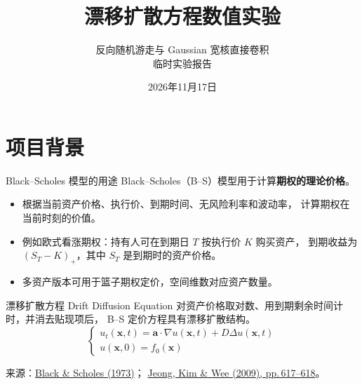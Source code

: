 \documentclass[UTF8,aspectratio=169,10pt]{ctexbeamer}
\title[漂移扩散方程的数值解]{漂移扩散方程数值实验}
\subtitle{反向随机游走与 Gaussian 宽核直接卷积\\临时实验报告}
\author{}\institute{}\date[]{2026年11月17日}
\begin{document}
\begin{frame}[plain]\titlepage\end{frame}
\section{项目背景}
\begin{frame}{Black--Scholes 模型的用途}
Black--Scholes（B--S）模型用于计算\textbf{期权的理论价格}。
\begin{itemize}
\item 根据当前资产价格、执行价、到期时间、无风险利率和波动率，
      计算期权在当前时刻的价值。
\item 例如欧式看涨期权：持有人可在到期日 $T$ 按执行价 $K$ 购买资产，
      到期收益为 $(S_T-K)_+$，其中 $S_T$ 是到期时的资产价格。
\item 多资产版本可用于篮子期权定价，空间维数对应资产数量。
\end{itemize}
\begin{block}{漂移扩散方程 Drift Diffusion Equation}
对资产价格取对数、用到期剩余时间计时，并消去贴现项后，
B--S 定价方程具有漂移扩散结构。
\begin{equation*}
      \begin{cases}
            u_t(\boldsymbol{x},t) = \boldsymbol{a}\cdot \nabla u(\boldsymbol{x},t) + D\Delta u(\boldsymbol{x},t)\\
            u(\boldsymbol{x},0) = f_0(\boldsymbol{x})
      \end{cases}
\end{equation*}
\end{block}
\vfill
{\scriptsize 来源：\href{https://doi.org/10.1086/260062}{Black \& Scholes (1973)}；
\href{https://doi.org/10.4134/CKMS.2009.24.4.617}{Jeong, Kim \& Wee (2009), pp.\,617--618}。\par}
\end{frame}
\end{document}
